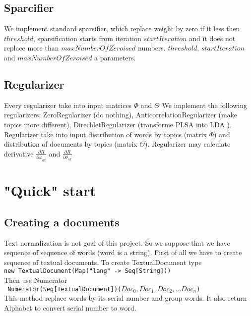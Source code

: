 \documentclass{article}
\begin{document}
        \subsection{Sparcifier}
            We implement standard sparsifier, which replace weight by zero if it less then $threshold$, sparsification starts from 
            iteration $startIteration$ and it does not replace more than $maxNumberOfZeroised$ numbers. $threshold$, $startIteration$ and 
            $maxNumberOfZeroised$ a parameters.
            
                        
        \subsection{Regularizer}
            Every regularizer take into input matrices $\Phi$ and $\Theta$
            We implement the following regularizers: ZeroRegularizer (do nothing), AnticorrelationRegularizer (make topics more different), 
            DirechletRegularizer (transforme PLSA into LDA ). \\
            Regularizer take into input distribution of words by topics (matrix $\Phi$) and distribution of documents by topics (matrix $\Theta$). 
            Regularizer may calculate derivative $\frac{\partial R}{\partial \varphi_{wt}}$ and $\frac{\partial R}{\partial \theta_{wt}}$

    \section{"Quick" start}
        \subsection{Creating a documents}
            Text normalization is not goal of this project. So we suppose that we have sequence of sequence of words (word is a string). 
            First of all we have to create sequence of textual documents. To create TextualDocument type\\
                \texttt{new TextualDocument(Map("lang" -> Seq[String])) }\\
            Then use Numerator \\
                \texttt{ Numerator(Seq[TextualDocument])($Doc_0, Doc_1, Doc_2, \dots Doc_n$) } \\
            This method replace words by its serial number and group words. It also return Alphabet to convert serial number to word. 
        
\end{document}
